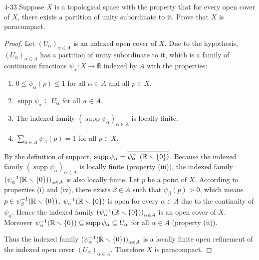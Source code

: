 \begin{problem}{4-33}\label{problem:4-33}
Suppose $X$ is a topological space with the property that for every open cover of $X$, there exists a partition of unity subordinate to it. Prove that $X$ is paracompact.
\end{problem}

\begin{proof}
	Let ${(U_{\alpha})}_{\alpha\in A}$ is an indexed open cover of $X$. Due to the hypothesis, ${(U_{\alpha})}_{\alpha\in A}$ has a partition of unity subordinate to it, which is a family of continuous functions $\psi_{\alpha}: X\to \mathbb{R}$ indexed by $A$ with the properties:
	\begin{enumerate}[label={(\arabic*)},itemsep=0pt]
		\item $0 \leq \psi_{\alpha}(p) \leq 1$ for all $\alpha\in A$ and all $p\in X$.
		\item $\operatorname{supp} \psi_{\alpha} \subseteq U_{\alpha}$ for all $\alpha\in A$.
		\item The indexed family ${(\operatorname{supp} \psi_{\alpha})}_{\alpha\in A}$ is locally finite.
		\item $\sum_{\alpha\in A}\psi_{A}(p) = 1$ for all $p\in X$.
	\end{enumerate}

	By the definition of support, $\operatorname{supp} \psi_{\alpha} = \overline{\psi_{\alpha}^{-1}(\mathbb{R}\smallsetminus \left\{{0}\right\})}$. Because the indexed family ${(\operatorname{supp} \psi_{\alpha})}_{\alpha\in A}$ is locally finite (property (iii)), the indexed family ${(\psi_{\alpha}^{-1}(\mathbb{R}\smallsetminus \left\{{0}\right\}))}_{\alpha\in A}$ is also locally finite. Let $p$ be a point of $X$. According to properties (i) and (iv), there exists $\beta\in A$ such that $\psi_{\beta}(p) > 0$, which means $p \in \psi_{\beta}^{-1}(\mathbb{R}\smallsetminus \left\{{0}\right\})$. $\psi_{\alpha}^{-1}(\mathbb{R}\smallsetminus \left\{{0}\right\})$ is open for every $\alpha\in A$ due to the continuity of $\psi_{\alpha}$. Hence the indexed family ${(\psi_{\alpha}^{-1}(\mathbb{R}\smallsetminus \left\{{0}\right\}))}_{\alpha\in A}$ is an open cover of $X$. Moreover $\psi_{\alpha}^{-1}(\mathbb{R}\smallsetminus \left\{{0}\right\}) \subseteq \operatorname{supp}\psi_{\alpha} \subseteq U_{\alpha}$ for all $\alpha\in A$ (property (ii)).

	Thus the indexed family ${(\psi_{\alpha}^{-1}(\mathbb{R}\smallsetminus \left\{{0}\right\}))}_{\alpha\in A}$ is a locally finite open refinement of the indexed open cover ${(U_{\alpha})}_{\alpha\in A}$. Therefore $X$ is paracompact.
\end{proof}

